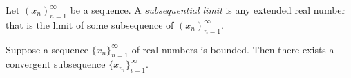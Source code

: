 \documentclass[../main.tex]{subfiles}
\begin{document}
    
    
    \begin{definition}
    Let  $ (x_n)^\infty_{n=1}$ be a sequence. A \textit{subsequential limit} is any extended real number that is the limit of some subsequence of  $ (x_n)^\infty_{n=1}$.
        
    \end{definition}
    
    
    
    
    \begin{theorem} \label{thm: Bolzano-Weierstrass}
    Suppose a sequence \( \{x_n\}_{n=1}^{\infty} \) of real numbers is bounded. Then there exists a convergent subsequence \( \{x_{n_i}\}_{i=1}^{\infty} \).
    \end{theorem}
    
    
    
\end{document}
